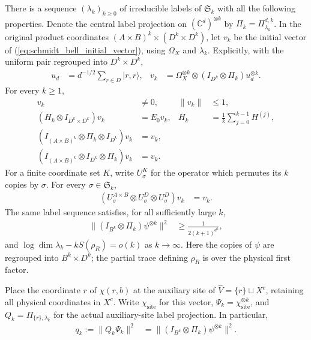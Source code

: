 \begin{theorem}
There is a sequence $(\lambda_k)_{k\ge0}$ of irreducible labels of
$\mathfrak S_k$ with all the following properties. Denote the central
label projection on $(\mathbb C^d)^{\otimes k}$ by
$\Pi_k=\Pi^{d,k}_{\lambda_k}$. In the original product coordinates
$(A\times B)^k\times(D^k\times D^k)$, let $v_k$ be the initial vector
of (\ref{eq:schmidt_bell_initial_vector}), using $\Omega_X$ and
$\lambda_k$. Explicitly, with the uniform pair regrouped into $D^k\times D^k$,
\begin{align}
 u_d&=d^{-1/2}\sum_{r\in D}|r,r\rangle,
 &v_k&=\Omega_X^{\otimes k}\otimes
       (I_{D^k}\otimes\Pi_k)u_d^{\otimes k}.
\end{align}
For every $k\ge1$,
\begin{align}
 v_k&\ne0,
 &\|v_k\|&\le1,\\
 (\overline H_k\otimes I_{D^k\times D^k})v_k&=E_0v_k,
 &\overline H_k&=\frac1k\sum_{j=0}^{k-1}H^{(j)},\\
 (I_{(A\times B)^k}\otimes\Pi_k\otimes I_{D^k})v_k&=v_k,\\
 (I_{(A\times B)^k}\otimes I_{D^k}\otimes\Pi_k)v_k&=v_k.
\end{align}
For a finite coordinate set $K$, write $U^K_\sigma$ for the operator
which permutes its $k$ copies by $\sigma$. For every
$\sigma\in\mathfrak S_k$,
\begin{align}
 (U^{A\times B}_\sigma\otimes U^D_\sigma\otimes U^D_\sigma)v_k&=v_k.
\end{align}
The same label sequence satisfies, for all sufficiently large $k$,
\begin{align}
 \|(I_{B^k}\otimes\Pi_k)\psi^{\otimes k}\|^2
   &\ge\frac1{2(k+1)^{d^2}},
\end{align}
and $\log\dim\lambda_k-kS(\rho_R)=o(k)$ as $k\to\infty$.
Here the copies of $\psi$ are regrouped into $B^k\times D^k$; the
partial trace defining $\rho_R$ is over the physical first factor.

Place the coordinate $r$ of $\chi(r,b)$ at the auxiliary site of
$\widehat V=\{r\}\sqcup X^c$, retaining all physical coordinates in
$X^c$. Write $\chi_{\mathrm{site}}$ for this vector,
$\Psi_k=\chi_{\mathrm{site}}^{\otimes k}$, and
$Q_k=\Pi_{\{r\},\lambda_k}$ for the actual auxiliary-site label
projection. In particular,
\begin{align}
 q_k:=\|Q_k\Psi_k\|^2
   &=\|(I_{B^k}\otimes\Pi_k)\psi^{\otimes k}\|^2.
\end{align}


\end{theorem}
